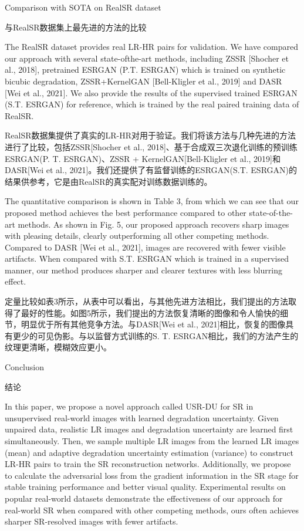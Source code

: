 Comparison with SOTA on RealSR dataset

与RealSR数据集上最先进的方法的比较

The RealSR dataset provides real LR-HR pairs for validation. We have compared our approach with several state-ofthe-art methods, including ZSSR [Shocher et al., 2018], pretrained ESRGAN (P.T. ESRGAN) which is trained on synthetic bicubic degradation, ZSSR+KernelGAN [Bell-Kligler et al., 2019] and DASR [Wei et al., 2021]. We also provide the results of the supervised trained ESRGAN (S.T. ESRGAN) for reference, which is trained by the real paired training data of RealSR.

RealSR数据集提供了真实的LR-HR对用于验证。我们将该方法与几种先进的方法进行了比较，包括ZSSR[Shocher et al., 2018]、基于合成双三次退化训练的预训练ESRGAN(P. T. ESRGAN)、ZSSR + KernelGAN[Bell-Kligler et al., 2019]和DASR[Wei et al., 2021]。我们还提供了有监督训练的ESRGAN(S.T. ESRGAN)的结果供参考，它是由RealSR的真实配对训练数据训练的。

The quantitative comparison is shown in Table 3, from which we can see that our proposed method achieves the best performance compared to other state-of-the-art methods. As shown in Fig. 5, our proposed approach recovers sharp images with pleasing details, clearly outperforming all other competing methods. Compared to DASR [Wei et al., 2021], images are recovered with fewer visible artifacts. When compared with S.T. ESRGAN which is trained in a supervised manner, our method produces sharper and clearer textures with less blurring effect.

定量比较如表3所示，从表中可以看出，与其他先进方法相比，我们提出的方法取得了最好的性能。如图5所示，我们提出的方法恢复清晰的图像和令人愉快的细节，明显优于所有其他竞争方法。与DASR[Wei et al., 2021]相比，恢复的图像具有更少的可见伪影。与以监督方式训练的S. T. ESRGAN相比，我们的方法产生的纹理更清晰，模糊效应更小。

Conclusion

结论
 
In this paper, we propose a novel approach called USR-DU for SR in unsupervised real-world images with learned degradation uncertainty. Given unpaired data, realistic LR images and degradation uncertainty are learned first simultaneously. Then, we sample multiple LR images from the learned LR images (mean) and adaptive degradation uncertainty estimation (variance) to construct LR-HR pairs to train the SR reconstruction networks. Additionally, we propose to calculate the adversarial loss from the gradient information in the SR stage for stable training performance and better visual quality. Experimental results on popular real-world datasets demonstrate the effectiveness of our approach for real-world SR when compared with other competing methods, ours often achieves sharper SR-resolved images with fewer artifacts.

